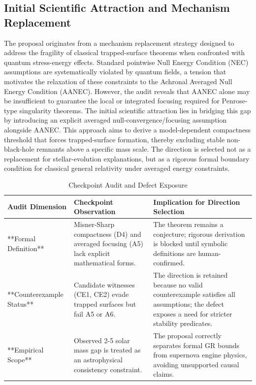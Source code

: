 \documentclass[conference]{IEEEtran}
\begin{document}
\subsection{Initial Scientific Attraction and Mechanism Replacement}
The proposal originates from a mechanism replacement strategy designed to address the fragility of classical trapped-surface theorems when confronted with quantum stress-energy effects. Standard pointwise Null Energy Condition (NEC) assumptions are systematically violated by quantum fields, a tension that motivates the relaxation of these constraints to the Achronal Averaged Null Energy Condition (AANEC). However, the audit reveals that AANEC alone may be insufficient to guarantee the local or integrated focusing required for Penrose-type singularity theorems. The initial scientific attraction lies in bridging this gap by introducing an explicit averaged null-convergence/focusing assumption alongside AANEC. This approach aims to derive a model-dependent compactness threshold that forces trapped-surface formation, thereby excluding stable non-black-hole remnants above a specific mass scale. The direction is selected not as a replacement for stellar-evolution explanations, but as a rigorous formal boundary condition for classical general relativity under averaged energy constraints.~\cite{cite_0ed84243cf171bc4}

\begin{table}[htbp]
\centering
\footnotesize
\setlength{\tabcolsep}{3pt}
\renewcommand{\arraystretch}{1.12}
\caption{Checkpoint Audit and Defect Exposure}
\label{tab:idea-origin-and-selection-block-2}
\begin{tabular}{|p{}|p{}|p{}|}
\hline
Audit Dimension & Checkpoint Observation & Implication for Direction Selection \\\hline
**Formal Definition** & Misner-Sharp compactness (D4) and averaged focusing (A5) lack explicit mathematical forms. & The theorem remains a conjecture; rigorous derivation is blocked until symbolic definitions are human-confirmed. \\\hline
**Counterexample Status** & Candidate witnesses (CE1, CE2) evade trapped surfaces but fail A5 or A6. & The direction is retained because no valid counterexample satisfies all assumptions; the defect exposes a need for stricter stability predicates. \\\hline
**Empirical Scope** & Observed 2-5 solar mass gap is treated as an astrophysical consistency constraint. & The proposal correctly separates formal GR bounds from supernova engine physics, avoiding unsupported causal claims. \\\hline
\end{tabular}
\end{table}
\end{document}
